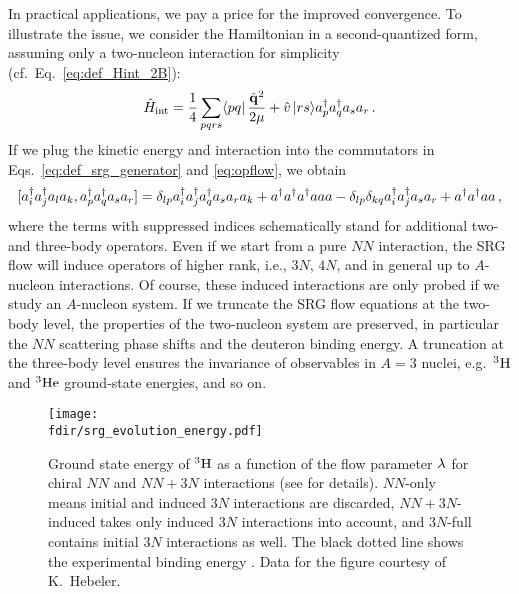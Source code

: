 {In practical applications, we pay a price for the improved convergence.
To illustrate the issue, we consider the Hamiltonian in a second-quantized 
form, assuming only a two-nucleon interaction for simplicity (cf.~Eq.~\eqref{eq:def_Hint_2B}):
\begin{equation}
  \Hint = \frac{1}{4}\sum_{pqrs} \matrixe{pq}{\frac{\qOV^2}{2\mu}+\vO}{rs}\aaO_p\aaO_q\aO_s\aO_r\,.
\end{equation}
If we plug the kinetic energy and interaction into the commutators in 
Eqs.~\eqref{eq:def_srg_generator} and \eqref{eq:opflow}, we obtain
\begin{equation}\label{eq:comm2B_vac}
  \comm{\aaO_i\aaO_j\aO_l\aO_k}{\aaO_p\aaO_q\aO_s\aO_r}=
  \delta_{lp}\aaO_i\aaO_j\aaO_q\aO_s\aO_r\aO_k + \aaO\aaO\aaO\aO\aO\aO
  -\delta_{lp}\delta_{kq}\aaO_i\aaO_j\aO_s\aO_r + \aaO\aaO\aO\aO\,, 
\end{equation}
where the terms with suppressed indices schematically stand for additional 
two- and three-body operators. Even if we start from a pure $NN$
interaction, the SRG flow will induce operators of higher rank, i.e., 
$3N$, $4N$, and in general up to $A$-nucleon interactions. Of course, 
these induced interactions are only probed if we study an $A$-nucleon 
system. If we truncate the SRG flow equations at the two-body level, 
the properties of the two-nucleon system are preserved, in particular
the $NN$ scattering phase shifts and the deuteron binding energy. A 
truncation at the three-body level ensures the invariance of observables 
in $A=3$ nuclei, e.g.~$\nuc{H}{3}$ and $\nuc{He}{3}$ ground-state energies, 
and so on. 


\begin{figure*}[t]
  \setlength{\unitlength}{\textwidth}
  \begin{center}
    \texttt{[image: \\fdir/srg\_evolution\_energy.pdf]}
  \end{center}  
  \vspace{-10pt}
  \caption{\label{fig:triton}Ground state energy of $\nuc{H}{3}$ as a function 
  of the flow parameter $\lambdaSRG$ for chiral \NNLO{} $NN$ and $NN\!+\!3N$ 
  interactions (see \cite{Hebeler:2012ly} for details). $NN$-only means initial and 
  induced $3N$ interactions are discarded, $NN\!+\!3N$-induced takes only 
  induced $3N$ interactions into account, and $3N$-full contains initial
  $3N$ interactions as well. The black dotted line shows the experimental 
  binding energy \cite{Wang:2012uq}. Data for the figure courtesy of 
  K.~Hebeler.}
\end{figure*}

}
